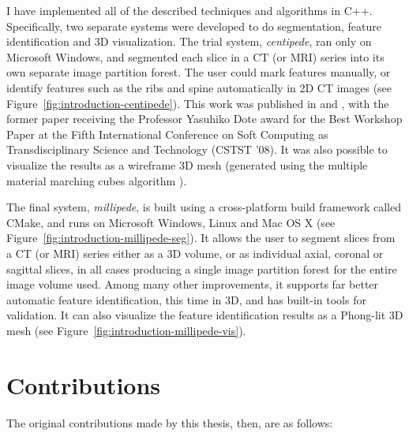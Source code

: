 
I have implemented all of the described techniques and algorithms in C++. Specifically, two separate systems were developed to do segmentation, feature identification and 3D visualization. The trial system, \emph{centipede}, ran only on Microsoft Windows, and segmented each slice in a CT (or MRI) series into its own separate image partition forest. The user could mark features manually, or identify features such as the ribs and spine automatically in 2D CT images (see Figure~\ref{fig:introduction-centipede}). This work was published in \cite{gvccimi08} and \cite{gvcispa09}, with the former paper receiving the Professor Yasuhiko Dote award for the Best Workshop Paper at the Fifth International Conference on Soft Computing as Transdisciplinary Science and Technology (CSTST '08). It was also possible to visualize the results as a wireframe 3D mesh (generated using the multiple material marching cubes algorithm \cite{wu03}).

The final system, \emph{millipede}, is built using a cross-platform build framework called CMake, and runs on Microsoft Windows, Linux and Mac OS X (see Figure~\ref{fig:introduction-millipede-seg}). It allows the user to segment slices from a CT (or MRI) series either as a 3D volume, or as individual axial, coronal or sagittal slices, in all cases producing a single image partition forest for the entire image volume used. Among many other improvements, it supports far better automatic feature identification, this time in 3D, and has built-in tools for validation. It can also visualize the feature identification results as a Phong-lit 3D mesh (see Figure~\ref{fig:introduction-millipede-vis}).

\section*{Contributions}

The original contributions made by this thesis, then, are as follows:

